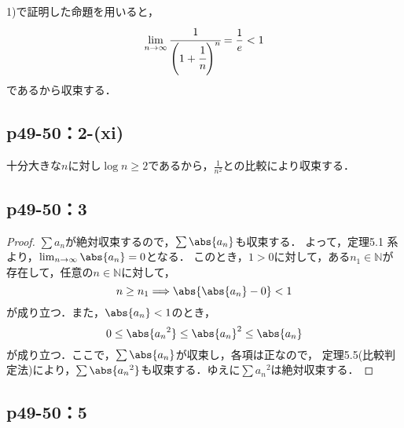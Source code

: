 \documentclass[uplatex,dvipdfmx,a4paper,10pt,fleqn]{jsarticle}
\begin{document}

    \begin{screen}
    1)で証明した命題を用いると，
    \[
      \lim _{n \to \infty} \cfrac{1}{\Bigg(1+\cfrac{1}{n}\Bigg)^n} = \frac{1}{e} < 1
    \]
    であるから収束する．
\end{screen}


\subsection*{p49-50：2-(xi)}


\begin{screen}
十分大きな$n$に対し$\log n \geq 2$であるから，$\frac{1}{n^2}$との比較により収束する．
\end{screen}

\newpage 

    \subsection*{p49-50：3}

    \begin{tleftbar}
        \begin{proof}
            $\sum a_n $が絶対収束するので，$\sum \abs{a_n}$も収束する．
            よって，定理5.1 系より，$\lim_{n \to \infty} \abs{a_n} =0$となる．
            このとき，$1>0$に対して，ある$n_1 \in \mathbb{N}$が存在して，任意の$n \in \mathbb{N}$に対して，
            \[
                n \ge n_1 \Longrightarrow \abs{\abs{a_n} -0}<1
            \]
            が成り立つ．また，$\abs{a_n}<1$のとき，
            \[
                0 \le \abs{{a_n}^2} \le {\abs{a_n}}^2 \le \abs{a_n}
            \]
            が成り立つ．ここで，$\sum \abs{a_n}$が収束し，各項は正なので， 定理5.5(比較判定法)により，$\sum \abs{{a_n}^2}$も収束する．ゆえに$\sum {a_n}^2$は絶対収束する．
        \end{proof}
    \end{tleftbar}


    \subsection*{p49-50：5}
\end{document}
